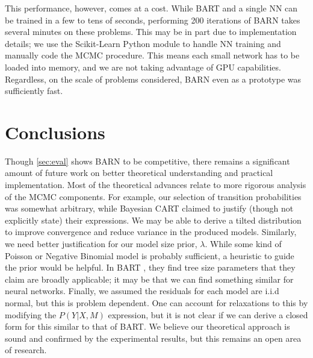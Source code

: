 \documentclass[12pt]{article}
\begin{document}
This performance, however, comes at a cost.  While BART and a single NN can be trained in a few to tens of seconds, performing 200 iterations of BARN takes several minutes on these problems.  This may be in part due to implementation details; we use the Scikit-Learn Python module to handle NN training \cite{scikit-learn} and manually code the MCMC procedure.  This means each small network has to be loaded into memory, and we are not taking advantage of GPU capabilities.  Regardless, on the scale of problems considered, BARN even as a prototype was sufficiently fast.

\section{Conclusions}\label{sec:conclusions}

Though \autoref{sec:eval} shows BARN to be competitive, there remains a significant amount of future work on better theoretical understanding and practical implementation.  Most of the theoretical advances relate to more rigorous analysis of the MCMC components.  For example, our selection of transition probabilities was somewhat arbitrary, while Bayesian CART \cite{chipman1998bayesian} claimed to justify (though not explicitly state) their expressions.  We may be able to derive a tilted distribution to improve convergence and reduce variance in the produced models.  Similarly, we need better justification for our model size prior, $\lambda$.  While some kind of Poisson or Negative Binomial model is probably sufficient, a heuristic to guide the prior would be helpful.  In BART \cite{chipman2010bart}, they find tree size parameters that they claim are broadly applicable; it may be that we can find something similar for neural networks.  Finally, we assumed the residuals for each model are i.i.d normal, but this is problem dependent.  One can account for relaxations to this by modifying the $P(Y|X,M)$ expression, but it is not clear if we can derive a closed form for this similar to that of BART.  We believe our theoretical approach is sound and confirmed by the experimental results, but this remains an open area of research.
\end{document}
